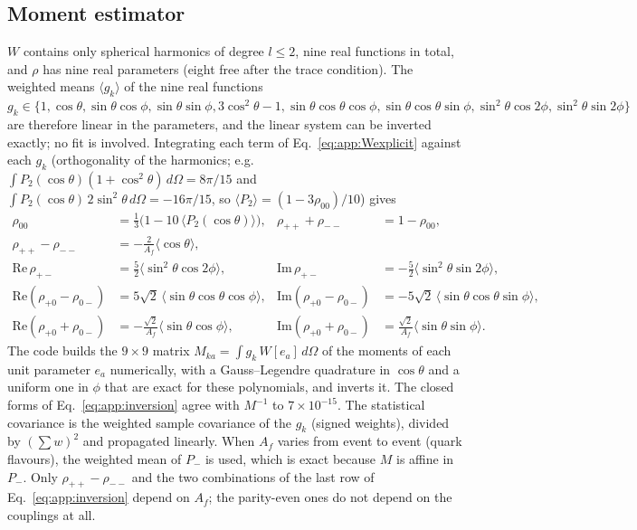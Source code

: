 \subsection{Moment estimator}
\label{app:truth:moments}
$W$ contains only spherical harmonics of degree $l \le 2$, nine real functions in total, and $\rho$ has nine real
parameters (eight free after the trace condition). The weighted means $\langle g_k\rangle$ of the nine real functions
$g_k \in \{1, \cos\theta, \sin\theta\cos\phi, \sin\theta\sin\phi, 3\cos^2\theta - 1, \sin\theta\cos\theta\cos\phi,
\sin\theta\cos\theta\sin\phi, \sin^2\theta\cos2\phi, \sin^2\theta\sin2\phi\}$ are therefore linear in the parameters,
and the linear system can be inverted exactly; no fit is involved. Integrating each term of
Eq.~\eqref{eq:app:Wexplicit} against each $g_k$ (orthogonality of the harmonics; e.g.\
$\int P_2(\cos\theta)(1+\cos^2\theta)\,d\Omega = 8\pi/15$ and $\int P_2(\cos\theta)\,2\sin^2\theta\,d\Omega = -16\pi/15$,
so $\langle P_2\rangle = (1 - 3\rho_{00})/10$) gives
\begin{align}
  \rho_{00} &= \tfrac13\big(1 - 10\,\langle P_2(\cos\theta)\rangle\big), & \rho_{++}+\rho_{--} &= 1-\rho_{00}, \nonumber\\
  \rho_{++} - \rho_{--} &= -\frac{2}{A_f}\langle\cos\theta\rangle, & & \nonumber\\
  \mathrm{Re}\,\rho_{+-} &= \tfrac52\langle\sin^2\theta\cos2\phi\rangle, &
  \mathrm{Im}\,\rho_{+-} &= -\tfrac52\langle\sin^2\theta\sin2\phi\rangle, \label{eq:app:inversion}\\
  \mathrm{Re}(\rho_{+0}-\rho_{0-}) &= 5\sqrt2\,\langle\sin\theta\cos\theta\cos\phi\rangle, &
  \mathrm{Im}(\rho_{+0}-\rho_{0-}) &= -5\sqrt2\,\langle\sin\theta\cos\theta\sin\phi\rangle, \nonumber\\
  \mathrm{Re}(\rho_{+0}+\rho_{0-}) &= -\frac{\sqrt2}{A_f}\langle\sin\theta\cos\phi\rangle, &
  \mathrm{Im}(\rho_{+0}+\rho_{0-}) &= \frac{\sqrt2}{A_f}\langle\sin\theta\sin\phi\rangle. \nonumber
\end{align}
The code builds the $9\times9$ matrix $M_{ka} = \int g_k\, W[e_a]\, d\Omega$ of the moments of each unit parameter $e_a$
numerically, with a Gauss--Legendre quadrature in $\cos\theta$ and a uniform one in $\phi$ that are exact for these
polynomials, and inverts it. The closed forms of Eq.~\eqref{eq:app:inversion} agree with $M^{-1}$ to $7\times10^{-15}$.
The statistical covariance is the weighted sample covariance of the $g_k$ (signed weights), divided by
$(\sum w)^2$ and propagated linearly. When $A_f$ varies from event to event (quark flavours), the weighted mean of $P_-$
is used, which is exact because $M$ is affine in $P_-$. Only $\rho_{++}-\rho_{--}$ and the two combinations of the last row of
Eq.~\eqref{eq:app:inversion} depend on $A_f$; the parity-even ones do not depend on the
couplings at all.

